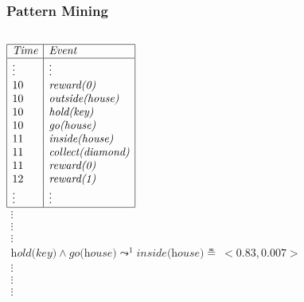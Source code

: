 \documentclass[aspectratio=169]{beamer}
\newcommand{\lpreimp}[1]{\leadsto^{#1}}
\begin{document}
\begin{frame}
  \frametitle{Pattern Mining}



  \begin{columns}
    \column{3cm}
    $
    \begin{array}{|l|l|}
      \hline
      \textit{Time} & \textit{Event} \\
      \hline
      \vdots & \vdots \\
      10 & \textit{reward(0)} \\
      10 & \textit{outside(house)} \\
      10 & \textit{hold(key)} \\
      10 & \textit{go(house)} \\
      11 & \textit{inside(house)} \\
      11 & \textit{collect(diamond)} \\
      11 & \textit{reward(0)} \\
      12 & \textit{reward(1)} \\
      \vdots & \vdots \\
      \hline
    \end{array}
    $
    \column{9cm}
    $
    \begin{array}{c}
      \vdots \\
      \vdots \\
      \vdots \\
      \textit{hold(key)} \land \textit{go(house)} \lpreimp{1}
      \textit{inside(house)} \measeq\ <\!0.83, 0.007\!> \\
      \vdots \\
      \vdots \\
      \vdots
    \end{array}
    $
  \end{columns}


\end{frame}
\end{document}
